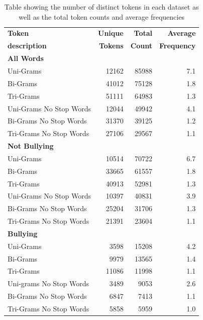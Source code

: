 \begin{table}[h]
\centering
\caption[Unique tokens, total count and average frequency]{Table showing the number of distinct tokens in each dataset as well as the total token counts and average frequencies}
\label{tab:chapter4:word_distribution}
\begin{tabular}{lrrr}
	\toprule
	{\textbf{Token}} 		& {\textbf{Unique}} & {\textbf{Total}} & {\textbf{Average}}  \\
	{\textbf{description}}	& {\textbf{Tokens}} & {\textbf{Count}} & {\textbf{Frequency}}  \\
    \midrule
    \midrule
    \multicolumn{1}{l}{\textbf{All Words}} \\
	\cmidrule(l){1-1}
	Uni-Grams					& 12162 &	85988	& 7.1 \\
	Bi-Grams					& 41012 &	75128	& 1.8 \\
	Tri-Grams					& 51111 &	64983	& 1.3 \\
	Uni-Grams No Stop Words		& 12044 &	49942	& 4.1 \\
	Bi-Grams No Stop Words		& 31370 &	39125	& 1.2 \\
	Tri-Grams No Stop Words		& 27106 &	29567	& 1.1 \\
    \midrule 
    \midrule
    \multicolumn{1}{l}{\textbf{Not Bullying}} \\
	\cmidrule(l){1-1}
	Uni-Grams					& 10514 &	70722	& 6.7 \\
	Bi-Grams					& 33665 &	61557	& 1.8 \\
	Tri-Grams					& 40913 &	52981	& 1.3 \\
	Uni-Grams No Stop Words		& 10397 &	40831	& 3.9 \\
	Bi-Grams No Stop Words		& 25204 &	31706	& 1.3 \\
	Tri-Grams No Stop Words		& 21391 &	23604	& 1.1 \\
    \midrule
    \midrule 
    \multicolumn{1}{l}{\textbf{Bullying}} \\
	\cmidrule(l){1-1}
	Uni-Grams					& 3598 &	15208	& 4.2 \\
	Bi-Grams					& 9979 &	13565	& 1.4 \\
	Tri-Grams					& 11086 &	11998	& 1.1 \\
	Uni-grams No Stop Words		& 3489 &	9053	& 2.6 \\
	Bi-Grams No Stop Words		& 6847 &	7413	& 1.1 \\
	Tri-Grams No Stop Words		& 5858 &	5959	& 1.0 \\
    \bottomrule
    \end{tabular}
\end{table}

